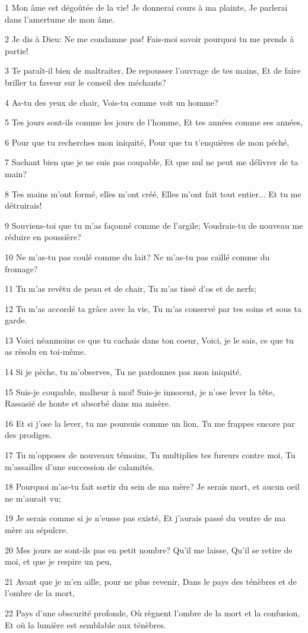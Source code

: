 \par 1 Mon âme est dégoûtée de la vie! Je donnerai cours à ma plainte, Je parlerai dans l'amertume de mon âme.
\par 2 Je dis à Dieu: Ne me condamne pas! Fais-moi savoir pourquoi tu me prends à partie!
\par 3 Te paraît-il bien de maltraiter, De repousser l'ouvrage de tes mains, Et de faire briller ta faveur sur le conseil des méchants?
\par 4 As-tu des yeux de chair, Vois-tu comme voit un homme?
\par 5 Tes jours sont-ils comme les jours de l'homme, Et tes années comme ses années,
\par 6 Pour que tu recherches mon iniquité, Pour que tu t'enquières de mon péché,
\par 7 Sachant bien que je ne suis pas coupable, Et que nul ne peut me délivrer de ta main?
\par 8 Tes mains m'ont formé, elles m'ont créé, Elles m'ont fait tout entier... Et tu me détruirais!
\par 9 Souviens-toi que tu m'as façonné comme de l'argile; Voudrais-tu de nouveau me réduire en poussière?
\par 10 Ne m'as-tu pas coulé comme du lait? Ne m'as-tu pas caillé comme du fromage?
\par 11 Tu m'as revêtu de peau et de chair, Tu m'as tissé d'os et de nerfs;
\par 12 Tu m'as accordé ta grâce avec la vie, Tu m'as conservé par tes soins et sous ta garde.
\par 13 Voici néanmoins ce que tu cachais dans ton coeur, Voici, je le sais, ce que tu as résolu en toi-même.
\par 14 Si je pèche, tu m'observes, Tu ne pardonnes pas mon iniquité.
\par 15 Suis-je coupable, malheur à moi! Suis-je innocent, je n'ose lever la tête, Rassasié de honte et absorbé dans ma misère.
\par 16 Et si j'ose la lever, tu me poursuis comme un lion, Tu me frappes encore par des prodiges.
\par 17 Tu m'opposes de nouveaux témoins, Tu multiplies tes fureurs contre moi, Tu m'assailles d'une succession de calamités.
\par 18 Pourquoi m'as-tu fait sortir du sein de ma mère? Je serais mort, et aucun oeil ne m'aurait vu;
\par 19 Je serais comme si je n'eusse pas existé, Et j'aurais passé du ventre de ma mère au sépulcre.
\par 20 Mes jours ne sont-ils pas en petit nombre? Qu'il me laisse, Qu'il se retire de moi, et que je respire un peu,
\par 21 Avant que je m'en aille, pour ne plus revenir, Dans le pays des ténèbres et de l'ombre de la mort,
\par 22 Pays d'une obscurité profonde, Où règnent l'ombre de la mort et la confusion, Et où la lumière est semblable aux ténèbres.

